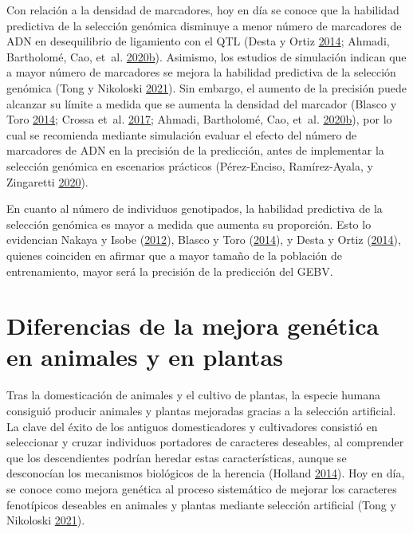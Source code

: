 \documentclass[11pt,spanish,a4paper,oneside,]{book} %
\begin{document}
Con relación a la densidad de marcadores, hoy en día se conoce que la habilidad predictiva de la selección genómica disminuye a menor número de marcadores de ADN en desequilibrio de ligamiento con el QTL (Desta y Ortiz \protect\hyperlink{ref-cite:10}{2014}; Ahmadi, Bartholomé, Cao, et~al. \protect\hyperlink{ref-cite:45}{2020}\protect\hyperlink{ref-cite:45}{b}). Asimismo, los estudios de simulación indican que a mayor número de marcadores se mejora la habilidad predictiva de la selección genómica (Tong y Nikoloski \protect\hyperlink{ref-cite:7}{2021}). Sin embargo, el aumento de la precisión puede alcanzar su límite a medida que se aumenta la densidad del marcador (Blasco y Toro \protect\hyperlink{ref-cite:3}{2014}; Crossa et~al. \protect\hyperlink{ref-cite:37}{2017}; Ahmadi, Bartholomé, Cao, et~al. \protect\hyperlink{ref-cite:45}{2020}\protect\hyperlink{ref-cite:45}{b}), por lo cual se recomienda mediante simulación evaluar el efecto del número de marcadores de ADN en la precisión de la predicción, antes de implementar la selección genómica en escenarios prácticos (Pérez-Enciso, Ramírez-Ayala, y Zingaretti \protect\hyperlink{ref-cite:47}{2020}).

En cuanto al número de individuos genotipados, la habilidad predictiva de la selección genómica es mayor a medida que aumenta su proporción. Esto lo evidencian Nakaya y Isobe (\protect\hyperlink{ref-cite:6}{2012}), Blasco y Toro (\protect\hyperlink{ref-cite:3}{2014}), y Desta y Ortiz (\protect\hyperlink{ref-cite:10}{2014}), quienes coinciden en afirmar que a mayor tamaño de la población de entrenamiento, mayor será la precisión de la predicción del GEBV.

\hypertarget{diferencias-de-la-mejora-genuxe9tica-en-animales-y-en-plantas}{%
\section{Diferencias de la mejora genética en animales y en plantas}\label{diferencias-de-la-mejora-genuxe9tica-en-animales-y-en-plantas}}

Tras la domesticación de animales y el cultivo de plantas, la especie humana consiguió producir animales y plantas mejoradas gracias a la selección artificial. La clave del éxito de los antiguos domesticadores y cultivadores consistió en seleccionar y cruzar individuos portadores de caracteres deseables, al comprender que los descendientes podrían heredar estas características, aunque se desconocían los mecanismos biológicos de la herencia (Holland \protect\hyperlink{ref-cite:43}{2014}). Hoy en día, se conoce como mejora genética al proceso sistemático de mejorar los caracteres fenotípicos deseables en animales y plantas mediante selección artificial (Tong y Nikoloski \protect\hyperlink{ref-cite:7}{2021}).
\end{document}
